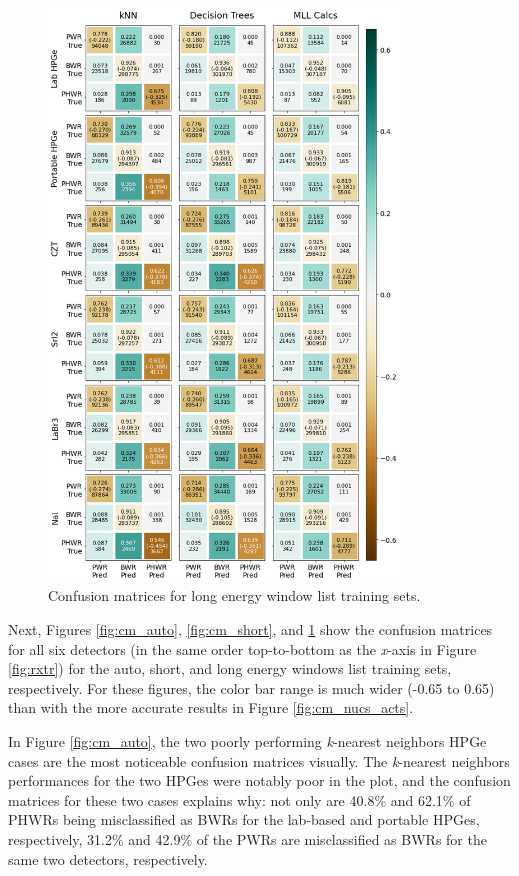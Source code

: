 \begin{figure}[!htbp]
  \centering
  \includegraphics[width=0.83\textwidth]{./chapters/exp2/confusion_matrix_6dets_long.png}
  \caption{Confusion matrices for long energy window list training sets.}
  \label{fig:cm_long}
\end{figure}

Next, Figures \ref{fig:cm_auto}, \ref{fig:cm_short}, and \ref{fig:cm_long} show
the confusion matrices for all six detectors (in the same order top-to-bottom
as the \textit{x}-axis in Figure \ref{fig:rxtr}) for the auto, short, and long
energy windows list training sets, respectively. For these figures, the color
bar range is much wider (-0.65 to 0.65) than with the more accurate results in
Figure \ref{fig:cm_nucs_acts}. 

In Figure \ref{fig:cm_auto}, the two poorly performing \textit{k}-nearest
neighbors \gls{HPGe} cases are the most noticeable confusion matrices visually.
The \textit{k}-nearest neighbors performances for the two \gls{HPGe}s were
notably poor in the plot, and the confusion matrices for these two cases
explains why: not only are 40.8\% and 62.1\% of \gls{PHWR}s being misclassified
as \gls{BWR}s for the lab-based and portable \gls{HPGe}s, respectively, 31.2\%
and 42.9\% of the \gls{PWR}s are misclassified as \gls{BWR}s for the same two
detectors, respectively.

